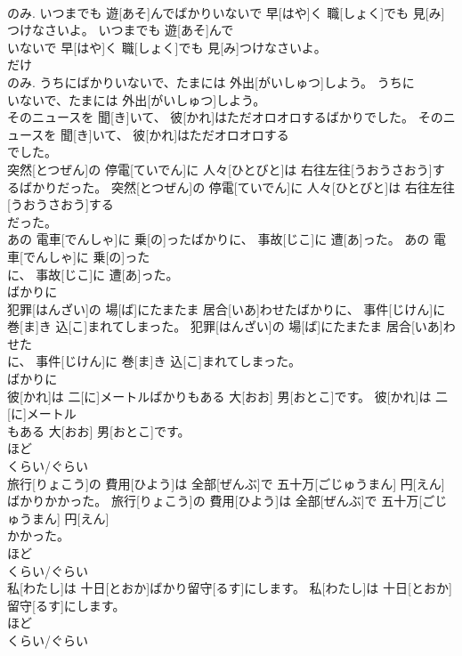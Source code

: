 \documentclass[8pt]{extreport}
\begin{document}
\begin{CJK}{UTF8}{min}
\\	のみ.	いつまでも 遊[あそ]んでばかりいないで 早[はや]く 職[しょく]でも 見[み]つけなさいよ。	いつまでも 遊[あそ]んで
\\	いないで 早[はや]く 職[しょく]でも 見[み]つけなさいよ。	
\\	だけ 
\\	のみ.	うちにばかりいないで、たまには 外出[がいしゅつ]しよう。	うちに
\\	いないで、たまには 外出[がいしゅつ]しよう。	
\\	そのニュースを 聞[き]いて、 彼[かれ]はただオロオロするばかりでした。	そのニュースを 聞[き]いて、 彼[かれ]はただオロオロする
\\	でした。	
\\	突然[とつぜん]の 停電[ていでん]に 人々[ひとびと]は 右往左往[うおうさおう]するばかりだった。	突然[とつぜん]の 停電[ていでん]に 人々[ひとびと]は 右往左往[うおうさおう]する
\\	だった。	
\\	あの 電車[でんしゃ]に 乗[の]ったばかりに、 事故[じこ]に 遭[あ]った。	あの 電車[でんしゃ]に 乗[の]った
\\	に、 事故[じこ]に 遭[あ]った。	
\\	ばかりに
\\	犯罪[はんざい]の 場[ば]にたまたま 居合[いあ]わせたばかりに、 事件[じけん]に 巻[ま]き 込[こ]まれてしまった。	犯罪[はんざい]の 場[ば]にたまたま 居合[いあ]わせた
\\	に、 事件[じけん]に 巻[ま]き 込[こ]まれてしまった。	
\\	ばかりに
\\	彼[かれ]は 二[に]メートルばかりもある 大[おお] 男[おとこ]です。	彼[かれ]は 二[に]メートル
\\	もある 大[おお] 男[おとこ]です。	
\\	ほど 
\\	くらい/ぐらい 
\\	旅行[りょこう]の 費用[ひよう]は 全部[ぜんぶ]で 五十万[ごじゅうまん] 円[えん]ばかりかかった。	旅行[りょこう]の 費用[ひよう]は 全部[ぜんぶ]で 五十万[ごじゅうまん] 円[えん]
\\	かかった。	
\\	ほど 
\\	くらい/ぐらい 
\\	私[わたし]は 十日[とおか]ばかり留守[るす]にします。	私[わたし]は 十日[とおか]
\\	留守[るす]にします。	
\\	ほど 
\\	くらい/ぐらい 

\end{CJK}
\end{document}
